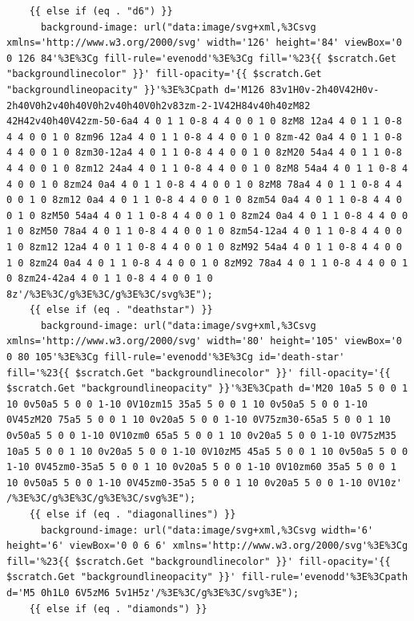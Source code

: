\documentclass[11pt]{article}
\begin{document}
\begin{enumerate}
\begin{verbatim}
    {{ else if (eq . "d6") }}
      background-image: url("data:image/svg+xml,%3Csvg xmlns='http://www.w3.org/2000/svg' width='126' height='84' viewBox='0 0 126 84'%3E%3Cg fill-rule='evenodd'%3E%3Cg fill='%23{{ $scratch.Get "backgroundlinecolor" }}' fill-opacity='{{ $scratch.Get "backgroundlineopacity" }}'%3E%3Cpath d='M126 83v1H0v-2h40V42H0v-2h40V0h2v40h40V0h2v40h40V0h2v83zm-2-1V42H84v40h40zM82 42H42v40h40V42zm-50-6a4 4 0 1 1 0-8 4 4 0 0 1 0 8zM8 12a4 4 0 1 1 0-8 4 4 0 0 1 0 8zm96 12a4 4 0 1 1 0-8 4 4 0 0 1 0 8zm-42 0a4 4 0 1 1 0-8 4 4 0 0 1 0 8zm30-12a4 4 0 1 1 0-8 4 4 0 0 1 0 8zM20 54a4 4 0 1 1 0-8 4 4 0 0 1 0 8zm12 24a4 4 0 1 1 0-8 4 4 0 0 1 0 8zM8 54a4 4 0 1 1 0-8 4 4 0 0 1 0 8zm24 0a4 4 0 1 1 0-8 4 4 0 0 1 0 8zM8 78a4 4 0 1 1 0-8 4 4 0 0 1 0 8zm12 0a4 4 0 1 1 0-8 4 4 0 0 1 0 8zm54 0a4 4 0 1 1 0-8 4 4 0 0 1 0 8zM50 54a4 4 0 1 1 0-8 4 4 0 0 1 0 8zm24 0a4 4 0 1 1 0-8 4 4 0 0 1 0 8zM50 78a4 4 0 1 1 0-8 4 4 0 0 1 0 8zm54-12a4 4 0 1 1 0-8 4 4 0 0 1 0 8zm12 12a4 4 0 1 1 0-8 4 4 0 0 1 0 8zM92 54a4 4 0 1 1 0-8 4 4 0 0 1 0 8zm24 0a4 4 0 1 1 0-8 4 4 0 0 1 0 8zM92 78a4 4 0 1 1 0-8 4 4 0 0 1 0 8zm24-42a4 4 0 1 1 0-8 4 4 0 0 1 0 8z'/%3E%3C/g%3E%3C/g%3E%3C/svg%3E");
    {{ else if (eq . "deathstar") }}
      background-image: url("data:image/svg+xml,%3Csvg xmlns='http://www.w3.org/2000/svg' width='80' height='105' viewBox='0 0 80 105'%3E%3Cg fill-rule='evenodd'%3E%3Cg id='death-star' fill='%23{{ $scratch.Get "backgroundlinecolor" }}' fill-opacity='{{ $scratch.Get "backgroundlineopacity" }}'%3E%3Cpath d='M20 10a5 5 0 0 1 10 0v50a5 5 0 0 1-10 0V10zm15 35a5 5 0 0 1 10 0v50a5 5 0 0 1-10 0V45zM20 75a5 5 0 0 1 10 0v20a5 5 0 0 1-10 0V75zm30-65a5 5 0 0 1 10 0v50a5 5 0 0 1-10 0V10zm0 65a5 5 0 0 1 10 0v20a5 5 0 0 1-10 0V75zM35 10a5 5 0 0 1 10 0v20a5 5 0 0 1-10 0V10zM5 45a5 5 0 0 1 10 0v50a5 5 0 0 1-10 0V45zm0-35a5 5 0 0 1 10 0v20a5 5 0 0 1-10 0V10zm60 35a5 5 0 0 1 10 0v50a5 5 0 0 1-10 0V45zm0-35a5 5 0 0 1 10 0v20a5 5 0 0 1-10 0V10z' /%3E%3C/g%3E%3C/g%3E%3C/svg%3E");
    {{ else if (eq . "diagonallines") }}
      background-image: url("data:image/svg+xml,%3Csvg width='6' height='6' viewBox='0 0 6 6' xmlns='http://www.w3.org/2000/svg'%3E%3Cg fill='%23{{ $scratch.Get "backgroundlinecolor" }}' fill-opacity='{{ $scratch.Get "backgroundlineopacity" }}' fill-rule='evenodd'%3E%3Cpath d='M5 0h1L0 6V5zM6 5v1H5z'/%3E%3C/g%3E%3C/svg%3E");
    {{ else if (eq . "diamonds") }}

\end{verbatim}
\end{enumerate}
\end{document}

